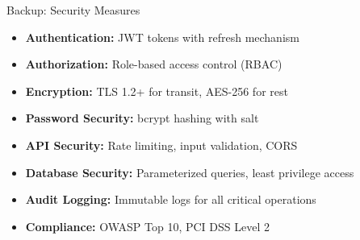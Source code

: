 \begin{frame}{Backup: Security Measures}
    \begin{itemize}
        \item \textbf{Authentication:} JWT tokens with refresh mechanism
        \item \textbf{Authorization:} Role-based access control (RBAC)
        \item \textbf{Encryption:} TLS 1.2+ for transit, AES-256 for rest
        \item \textbf{Password Security:} bcrypt hashing with salt
        \item \textbf{API Security:} Rate limiting, input validation, CORS
        \item \textbf{Database Security:} Parameterized queries, least privilege access
        \item \textbf{Audit Logging:} Immutable logs for all critical operations
        \item \textbf{Compliance:} OWASP Top 10, PCI DSS Level 2
    \end{itemize}
\end{frame}


